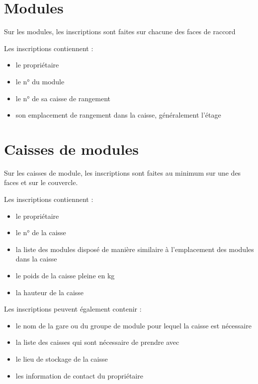 
\section{Modules}

Sur les modules, les inscriptions sont faites sur chacune des faces de raccord

Les inscriptions contiennent :

\begin{itemize}
    \item le propriétaire
    \item le n° du module
    \item le n° de sa caisse de rangement
    \item son emplacement de rangement dans la caisse, généralement l'étage
\end{itemize}


\section{Caisses de modules}

Sur les caisses de module, les inscriptions sont faites au minimum sur une des faces et sur le couvercle.

Les inscriptions contiennent :

\begin{itemize}
    \item le propriétaire
    \item le n° de la caisse
    \item la liste des modules disposé de manière similaire à l'emplacement des modules dans la caisse
    \item le poids de la caisse pleine en kg
    \item la hauteur de la caisse
\end{itemize}

Les inscriptions peuvent également contenir :

\begin{itemize}
    \item le nom de la gare ou du groupe de module pour lequel la caisse est nécessaire
    \item la liste des caisses qui sont nécessaire de prendre avec
    \item le lieu de stockage de la caisse
    \item les information de contact du propriétaire
\end{itemize}

